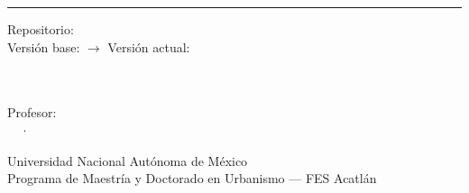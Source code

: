 
\begin{titlepage}
\thispagestyle{empty}
\setcounter{page}{0}
\centering

\vspace*{4cm}

{\huge\bfseries \TituloArticulo}

\vspace{0.5cm}
{\color{ColorPrincipal}\rule{0.45\textwidth}{0.8pt}}
\vspace{0.4cm}

{\large\itshape\color{ColorTexto} \SubtituloArticulo}

\vfill

{\small\color{ColorPrincipal!70!black}
  Repositorio: \texttt{\NombreRepo}\\[0.2cm]
  Versión base: \texttt{\VerRef} \quad $\rightarrow$ \quad Versión actual: \texttt{\VerActual}
}

\vspace{1.2cm}

{\normalsize\textbf{\Autor}}\\[0.4cm]
{\small \Materia}\\[0.15cm]
{\small Profesor:\ \ProfesorAsignado}\\[0.15cm]
{\small \Semestre\ \ ·\ \ \FechaEntrega}

\vspace{1.8cm}

{\footnotesize\color{ColorPrincipal}
  Universidad Nacional Autónoma de México\\
  Programa de Maestría y Doctorado en Urbanismo — FES Acatlán%
}

\vspace{1cm}

\end{titlepage}
